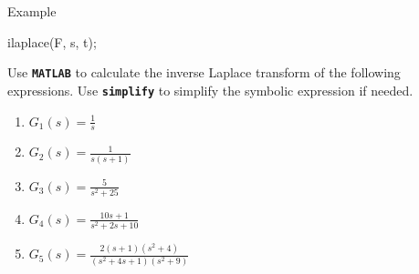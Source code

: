 \documentclass{article}
\begin{document}
\begin{par}
\begin{flushleft}
Example
\end{flushleft}
\end{par}

\begin{matlabcode}
ilaplace(F, s, t);
\end{matlabcode}



\begin{par}
\begin{flushleft}
Use \texttt{\textbf{MATLAB}} to calculate the inverse Laplace transform of the following expressions. Use \texttt{\textbf{simplify}} to simplify the symbolic expression if needed.
\end{flushleft}
\end{par}

\begin{enumerate}
\setlength{\itemsep}{-1ex}
   \item{\begin{flushleft} $\displaystyle G_1 (s)={{\frac{1}{s}}}$ \end{flushleft}}
   \item{\begin{flushleft} $\displaystyle G_2 (s)={{\frac{1}{s(s+1)}}}$ \end{flushleft}}
   \item{\begin{flushleft} $\displaystyle G_3 (s)={{\frac{5}{s^2 +25}}}$ \end{flushleft}}
   \item{\begin{flushleft} $\displaystyle G_4 (s)={{\frac{10s+1}{s^2 +2s+10}}}$ \end{flushleft}}
   \item{\begin{flushleft} $\displaystyle G_5 (s)={{\frac{2(s+1)(s^2 +4)}{(s^2 +4s+1)(s^2 +9)}}}$ \end{flushleft}}
\end{enumerate}
\end{document}
